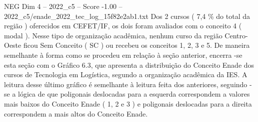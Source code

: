 \begin{textsample}{NEG Dim 4 – 2022\_c5 – Score -1.00 – 2022\_c5/enade\_2022\_tec\_log\_15f82e2ab1.txt}
Dos 2 cursos ( 7,4 \% do total da região ) oferecidos em CEFET/IF, os dois foram avaliados com o conceito 4 ( modal ).
Nesse tipo de organização acadêmica, nenhum curso da região Centro-Oeste ficou Sem Conceito ( SC ) ou recebeu os conceitos 1, 2, 3 e 5.
De maneira semelhante à forma como se procedeu em relação à seção anterior, encerra -se esta seção com o Gráfico 6.3, que apresenta a distribuição do Conceito Enade dos cursos de Tecnologia em Logística, segundo a organização acadêmica da IES.
A leitura desse último gráfico é semelhante à leitura feita dos anteriores, seguindo -se a lógica de que poligonais deslocadas para a esquerda correspondem a valores mais baixos do Conceito Enade ( 1, 2 e 3 ) e poligonais deslocadas para a direita correspondem a mais altos do Conceito Enade.

\end{textsample}
